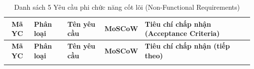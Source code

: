 \documentclass[12pt,a4paper]{article}
\begin{document}
\vspace{0.2cm}
\noindent
\small
\renewcommand{\arraystretch}{1.3}
\begin{xltabular}{\textwidth}{|c|>{\raggedright\arraybackslash}p{2.8cm}|>{\raggedright\arraybackslash}p{4cm}|c|>{\raggedright\arraybackslash}X|}
\caption{Danh sách 5 Yêu cầu phi chức năng cốt lõi (Non-Functional Requirements)} \label{tab:nfr} \\
\hline
{}
\textbf{Mã YC} & \textbf{Phân loại} & \textbf{Tên yêu cầu} & \textbf{MoSCoW} & \textbf{Tiêu chí chấp nhận (Acceptance Criteria)} \\
\hline
\endfirsthead

\hline
{}
\textbf{Mã YC} & \textbf{Phân loại} & \textbf{Tên yêu cầu} & \textbf{MoSCoW} & \textbf{Tiêu chí chấp nhận (tiếp theo)} \\
\hline
\endhead

\hline
\endfoot

\hline
\endlastfoot


\end{xltabular}
\end{document}
